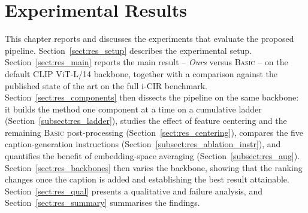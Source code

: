 

\chapter{Experimental Results}\label{chapt:results}

This chapter reports and discusses the experiments that evaluate the proposed
pipeline. Section~\ref{sect:res_setup} describes the experimental setup.
Section~\ref{sect:res_main} reports the main result -- \emph{Ours} versus
\textsc{Basic} -- on the default CLIP ViT-L/14 backbone, together with a
comparison against the published state of the art on the full i-CIR benchmark.
Section~\ref{sect:res_components} then dissects the pipeline on the same backbone:
it builds the method one component at a time on a cumulative ladder
(Section~\ref{subsect:res_ladder}), studies the effect of feature centering and
the remaining \textsc{Basic} post-processing
(Section~\ref{sect:res_centering}), compares the five caption-generation
instructions (Section~\ref{subsect:res_ablation_instr}), and quantifies the
benefit of embedding-space averaging
(Section~\ref{subsect:res_aug}). Section~\ref{sect:res_backbones} then varies the
backbone, showing that the ranking changes once the caption is added and
establishing the best result attainable. Section~\ref{sect:res_qual} presents a
qualitative and failure analysis, and Section~\ref{sect:res_summary} summarises
the findings.

